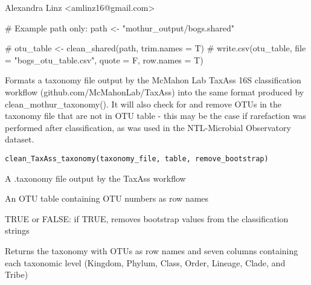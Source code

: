\documentclass[a4paper]{book}
\begin{document}
%
\begin{Author}\relax
Alexandra Linz <amlinz16@gmail.com>
\end{Author}
%
\begin{Examples}
\begin{ExampleCode}

# Example path only: path <- "mothur_output/bogs.shared"

# otu_table <- clean_shared(path, trim.names = T)
# write.csv(otu_table, file = "bogs_otu_table.csv", quote = F, row.names = T)

\end{ExampleCode}
\end{Examples}
%
\begin{Description}\relax
Formats a taxonomy file output by the McMahon Lab TaxAss 16S classification workflow (github.com/McMahonLab/TaxAss) into the same format produced by clean\_mothur\_taxonomy(). It will also check for and remove OTUs in the taxonomy file that are not in OTU table - this may be the case if rarefaction was performed after classification, as was used in the NTL-Microbial Observatory dataset.
\end{Description}
%
\begin{Usage}
\begin{verbatim}
clean_TaxAss_taxonomy(taxonomy_file, table, remove_bootstrap)
\end{verbatim}
\end{Usage}
%
\begin{Arguments}
\begin{ldescription}
\item[\code{taxonomy\_file}] 
A .taxonomy file output by the TaxAss workflow

\item[\code{table}] 
An OTU table containing OTU numbers as row names

\item[\code{remove\_bootstrap}] 
TRUE or FALSE: if TRUE, removes bootstrap values from the classification strings

\end{ldescription}
\end{Arguments}
%
\begin{Value}
Returns the taxonomy with OTUs as row names and seven columns containing each taxonomic level (Kingdom, Phylum, Class, Order, Lineage, Clade, and Tribe)
\end{Value}
\end{document}
